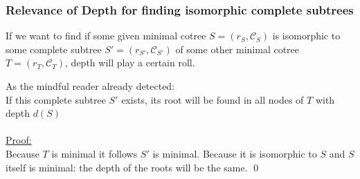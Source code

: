 \documentclass[a4paper,12pt]{article}
\theoremstyle{definition}
\begin{document}
		\subsubsection{Relevance of Depth for finding isomorphic complete subtrees}
		
			If we want to find if some given minimal cotree $S=(r_S, \mathcal{C}_S)$ is isomorphic to some  complete subtree $S'=(r_{S'},\mathcal{C}_{S'})$ of some other minimal cotree $T=(r_T, \mathcal{C}_T)$, depth will play a certain roll.
			\begin{center}
			\end{center}
			As the mindful reader already detected:\\
			If this complete subtree $S'$ exists, its root will be found in all nodes of $T$ with depth $d(S)$\\\\
			\underline{Proof:}\\ Because $T$ is minimal it follows $S'$ is minimal. Because it is isomorphic to $S$ and $S$ itself is minimal: the depth of the roots will be the same. \qed
\end{document}
